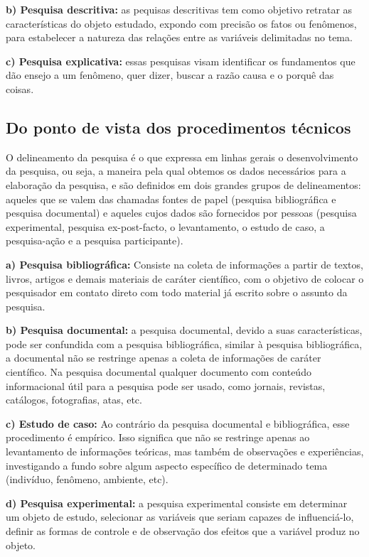 \textbf{b) Pesquisa descritiva:} as pequisas descritivas tem como objetivo retratar as características do objeto estudado, expondo com precisão os fatos ou fenômenos, para estabelecer a natureza das relações entre as variáveis delimitadas no tema.

\textbf{c) Pesquisa explicativa:} essas pesquisas visam identificar os fundamentos que dão ensejo a um fenômeno, quer dizer, buscar a razão causa e o porquê das coisas. 

\subsection{Do ponto de vista dos procedimentos técnicos}
O delineamento da pesquisa é o que expressa em linhas gerais o desenvolvimento da pesquisa, ou seja, a maneira pela qual obtemos os dados necessários para a elaboração da pesquisa, e são definidos em dois grandes grupos de delineamentos: aqueles que se valem das chamadas fontes de papel (pesquisa bibliográfica e pesquisa documental) e aqueles cujos dados são fornecidos por pessoas (pesquisa experimental, pesquisa ex-post-facto, o levantamento, o estudo de caso, a pesquisa-ação e a pesquisa participante)\cite{de2013metodologia, gil2002elaborar}.

\textbf{a) Pesquisa bibliográfica:} Consiste na coleta de informações a partir de textos, livros, artigos e demais materiais de caráter científico, com o objetivo de colocar o pesquisador em contato direto com todo material já escrito sobre o assunto da pesquisa.

\textbf{b) Pesquisa documental:} a pesquisa documental, devido a suas características, pode ser confundida com a pesquisa bibliográfica, similar à pesquisa bibliográfica, a documental não se restringe apenas a coleta de informações de caráter científico. Na pesquisa documental qualquer documento com conteúdo informacional útil para a pesquisa pode ser usado, como jornais, revistas, catálogos, fotografias, atas, etc.

\textbf{c) Estudo de caso:} Ao contrário da pesquisa documental e bibliográfica, esse procedimento é empírico. Isso significa que não se restringe apenas ao levantamento de informações teóricas, mas também de observações e experiências, investigando a fundo sobre algum aspecto específico de determinado tema (indivíduo, fenômeno, ambiente, etc). 

\textbf{d) Pesquisa experimental:} a pesquisa experimental consiste em determinar um objeto de estudo, selecionar as variáveis que seriam capazes de influenciá-lo, definir as formas de controle e de observação dos efeitos que a variável produz no objeto.

